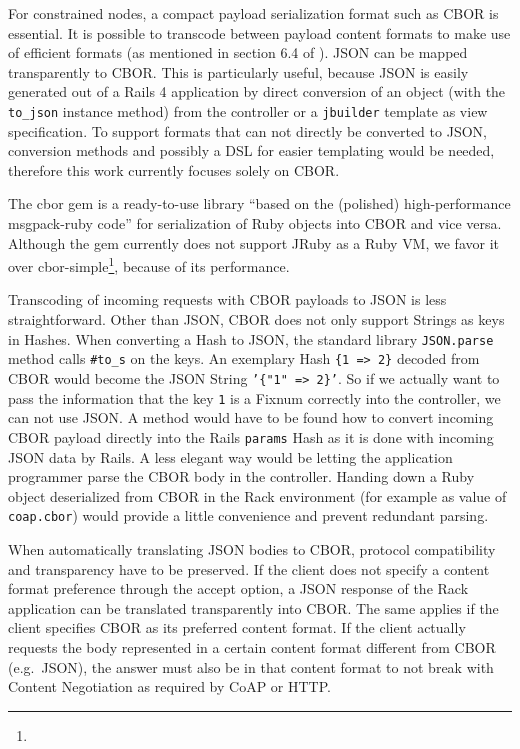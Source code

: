 		For constrained nodes, a compact payload serialization format such as
		\ac{CBOR} \cite{cbor} is essential. It is possible to transcode between
		payload content formats to make use of efficient formats (as mentioned
		in section 6.4 of \cite{coap-mapping}). \ac{JSON} can be mapped
		transparently to \ac{CBOR}. This is particularly useful, because
		\ac{JSON} is easily generated out of a \ac{Rails} 4 application by
		direct conversion of an object (with the \texttt{to\_json} instance
		method) from the controller or a \texttt{jbuilder} template as view
		specification. To support formats that can not directly be converted to
		\ac{JSON}, conversion methods and possibly a \ac{DSL} for easier
		templating would be needed, therefore this work currently focuses
		solely on \ac{CBOR}.

		The cbor gem \cite{cbor-gem} is a ready-to-use library \enquote{based
		on the (polished) high-performance msgpack-ruby code} for serialization
		of Ruby objects into \ac{CBOR} and vice versa. Although the gem
		currently does not support JRuby as a Ruby \ac{VM}, we favor it over
		cbor-simple\footnote{\urlCborSimple}, because of its performance.

		Transcoding of incoming requests with \ac{CBOR} payloads to \ac{JSON}
		is less straightforward. Other than \ac{JSON}, \ac{CBOR} does not only
		support Strings as keys in Hashes. When converting a Hash to \ac{JSON},
		the standard library \texttt{JSON.parse} method calls \texttt{\#to\_s}
		on the keys. An exemplary Hash \texttt{\{1 => 2\}} decoded from
		\ac{CBOR} would become the \ac{JSON} String \texttt{'\{"1" => 2\}'}. So
		if we actually want to pass the information that the key \texttt{1} is
		a Fixnum correctly into the controller, we can not use \ac{JSON}. A
		method would have to be found how to convert incoming \ac{CBOR} payload
		directly into the Rails \texttt{params} Hash as it is done with
		incoming \ac{JSON} data by Rails. A less elegant way would be letting
		the application programmer parse the \ac{CBOR} body in the controller.
		Handing down a Ruby object deserialized from \ac{CBOR} in the Rack
		environment (for example as value of \texttt{coap.cbor}) would provide
		a little convenience and prevent redundant parsing.

		When automatically translating \ac{JSON} bodies to \ac{CBOR}, protocol
		compatibility and transparency have to be preserved. If the client does
		not specify a content format preference through the accept option, a
		\ac{JSON} response of the Rack application can be translated
		transparently into \ac{CBOR}. The same applies if the client specifies
		\ac{CBOR} as its preferred content format. If the client actually
		requests the body represented in a certain content format different
		from \ac{CBOR} (e.g.\ \ac{JSON}), the answer must also be in that
		content format to not break with Content Negotiation as required by
		\ac{CoAP} or \ac{HTTP}.


